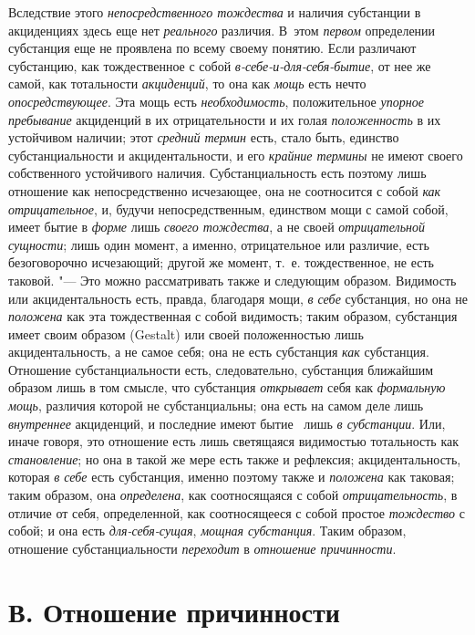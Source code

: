 Вследствие этого {\em непосредственного тождества} и
наличия субстанции в акциденциях здесь еще нет
{\em реального} различия. В~этом
{\em первом} определении субстанция еще не проявлена по
всему своему понятию. Если различают субстанцию, как тождественное с собой
{\em в-себе-и-для-себя-бытие}, от нее же самой, как
тотальности {\em акциденций}, то она как
{\em мощь} есть нечто
{\em опосредствующее}. Эта мощь есть
{\em необходимость}, положительное
{\em упорное пребывание} акциденций в их
отрицательности и их голая {\em положенность} в их
устойчивом наличии; этот {\em средний термин} есть,
стало быть, единство субстанциальности и акцидентальности, и его
{\em крайние термины} не имеют своего собственного
устойчивого наличия. Субстанциальность есть поэтому лишь отношение как
непосредственно исчезающее, она не соотносится с собой
{\em как отрицательное}, и, будучи непосредственным,
единством мощи с самой собой, имеет бытие в {\em форме}
лишь {\em своего тождества}, а не своей
{\em отрицательной сущности}; лишь один момент, а
именно, отрицательное или различие, есть безоговорочно исчезающий; другой
же момент, т.~е. тождественное, не есть таковой. "--- Это можно рассматривать
также и следующим образом. Видимость или акцидентальность есть, правда,
благодаря мощи, {\em в себе} субстанция, но она не
{\em положена} как эта тождественная с собой видимость;
таким образом, субстанция имеет своим образом (Gestalt) или своей
положенностью лишь акцидентальность, а не самое себя; она не есть
субстанция {\em как} субстанция. Отношение
субстанциальности есть, следовательно, субстанция ближайшим образом лишь в
том смысле, что субстанция {\em открывает} себя как
{\em формальную мощь}, различия которой не
субстанциальны; она есть на самом деле лишь
{\em внутреннее} акциденций, и последние имеют бытие
\ лишь {\em в субстанции}. Или, иначе говоря, это
отношение есть лишь светящаяся видимостью тотальность как
{\em становление}; но она в такой же мере есть также и
рефлексия; акцидентальность, которая {\em в себе} есть
субстанция, именно поэтому также и {\em положена} как
таковая; таким образом, она {\em определена}, как
соотносящаяся с собой {\em отрицательность}, в отличие
от себя, определенной, как соотносящееся с собой простое
{\em тождество} с собой; и она есть
{\em для-себя-сущая}, {\em мощная
субстанция}. Таким образом, отношение субстанциальности
{\em переходит} в {\em отношение
причинности}.


\section[В. Отношение причинности]{В. Отношение причинности}

